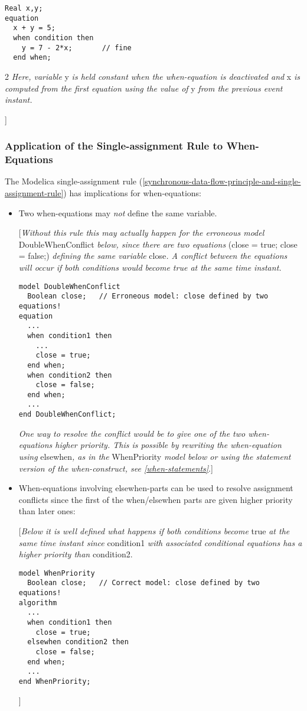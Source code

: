 \begin{lstlisting}[language=modelica]
  Real x,y; 
equation   
  x + y = 5;   
  when condition then     
    y = 7 - 2*x;       // fine  
  end when;
\end{lstlisting}
2
\emph{Here, variable} y \emph{is held constant when the when-equation is
deactivated and} x \emph{is computed from the first equation using the
value of} y \emph{from the previous event instant.}

{]}

\subsubsection{Application of the Single-assignment Rule to When-Equations}

The Modelica single-assignment rule (\autoref{synchronous-data-flow-principle-and-single-assignment-rule}) has implications for
when-equations:

\begin{itemize}
\item  Two when-equations may \emph{not} define the same variable.

{[}\emph{Without this rule this may actually happen for the erroneous
model} DoubleWhenConflict \emph{below, since there are two equations}
(close = true; close = false;) \emph{defining the same variable}
close\emph{. A conflict between the equations will occur if both
conditions would become true at the same time instant.}

\begin{lstlisting}[language=modelica]
model DoubleWhenConflict   
  Boolean close;   // Erroneous model: close defined by two equations! 
equation   
  ...   
  when condition1 then 
    ...
    close = true;   
  end when;   
  when condition2 then     
    close = false;   
  end when;   
  ... 
end DoubleWhenConflict;
\end{lstlisting}

\emph{One way to resolve the conflict would be to give one of the two
when-equations higher priority. This is possible by rewriting the
when-equation using} elsewhen\emph{, as in the} WhenPriority \emph{model
below or using the statement version of the when-construct, see \autoref{when-statements}}.{]}

\item  When-equations involving elsewhen-parts can be used to resolve
  assignment conflicts since the first of the when/elsewhen parts are
  given higher priority than later ones:

{[}\emph{Below it is well defined what happens if both conditions
become} true \emph{at the same time instant since} condition1 \emph{with
associated conditional equations has a higher priority than} condition2.

\begin{lstlisting}[language=modelica]
model WhenPriority   
  Boolean close;   // Correct model: close defined by two equations! 
algorithm   
  ...   
  when condition1 then
    close = true;
  elsewhen condition2 then
    close = false;
  end when;   
  ... 
end WhenPriority; 
\end{lstlisting}
{]}
\end{itemize}
